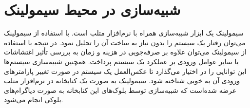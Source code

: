 \chapter{شبیه‌سازی  در محیط سیمولینک}
سیمولینک یک ابزار شبیه‌سازی همراه با نرم‌افزار متلب است.
با استفاده از سیمولینک می‌توان رفتار یک سیستم را بدون نیاز به ساخت آن را تحلیل نمود. در نتیجه با استفاده از سیمولینک می‌توان علاوه بر صرفه‌جویی در هزینه و زمان به بررسی تأثیر اغتشاشات یا سایر عوامل ورودی بر عملکرد یک سیستم پرداخت. همچنین شبیه‌سازی سیستم‌ها این توانایی را در اختیار می‌گذارد تا عکس‌العمل یک سیستم در صورت تغییر پارامترهای ورودی آن به خوبی شناخته شود. سیمولینک به صورت یک کتابخانه در نرم‌افزار متلب عرضه شده‌است که شبیه‌سازی توسط بلوک‌های این کتابخانه به صورت دیاگرام‌های بلوکی انجام می‌شود.
